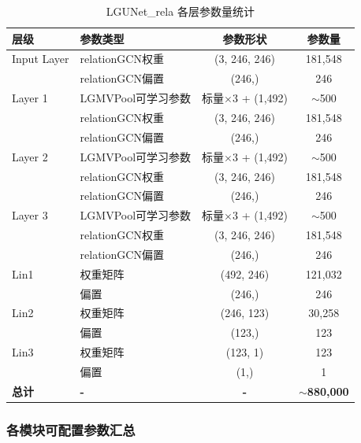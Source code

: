 \begin{table}[htbp]
\centering
\caption{LGUNet\_rela 各层参数量统计}
\label{tab:layer_params}
\begin{tabular}{llcc}
\toprule
层级 & 参数类型 & 参数形状 & 参数量 \\
\midrule
Input Layer & relationGCN权重 & (3, 246, 246) & 181,548 \\
            & relationGCN偏置 & (246,) & 246 \\
\midrule
Layer 1 & LGMVPool可学习参数 & 标量$\times$3 + (1,492) & $\sim$500 \\
        & relationGCN权重 & (3, 246, 246) & 181,548 \\
        & relationGCN偏置 & (246,) & 246 \\
\midrule
Layer 2 & LGMVPool可学习参数 & 标量$\times$3 + (1,492) & $\sim$500 \\
        & relationGCN权重 & (3, 246, 246) & 181,548 \\
        & relationGCN偏置 & (246,) & 246 \\
\midrule
Layer 3 & LGMVPool可学习参数 & 标量$\times$3 + (1,492) & $\sim$500 \\
        & relationGCN权重 & (3, 246, 246) & 181,548 \\
        & relationGCN偏置 & (246,) & 246 \\
\midrule
\midrule
Lin1 & 权重矩阵 & (492, 246) & 121,032 \\
     & 偏置 & (246,) & 246 \\
\midrule
Lin2 & 权重矩阵 & (246, 123) & 30,258 \\
     & 偏置 & (123,) & 123 \\
\midrule
Lin3 & 权重矩阵 & (123, 1) & 123 \\
     & 偏置 & (1,) & 1 \\
\midrule
\midrule
\textbf{总计} & \textbf{-} & \textbf{-} & \textbf{$\sim$880,000} \\
\bottomrule
\end{tabular}
\end{table}

\subsubsection{各模块可配置参数汇总}

